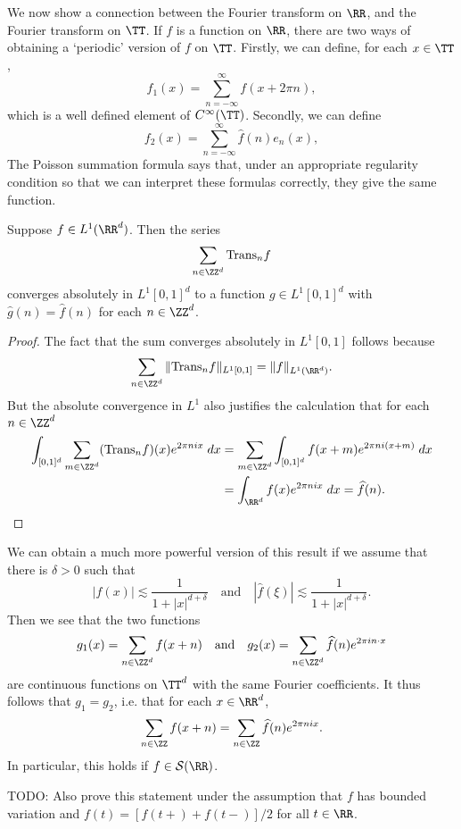 We now show a connection between the Fourier transform on $\RR$, and the Fourier transform on $\TT$. If $f$ is a function on $\RR$, there are two ways of obtaining a `periodic' version of $f$ on $\TT$. Firstly, we can define, for each $x \in \TT$,
%
\[ f_1(x) = \sum_{n = -\infty}^\infty f(x + 2 \pi n), \]
%
which is a well defined element of $C^\infty(\TT)$. Secondly, we can define
%
\[ f_2(x) = \sum_{n = -\infty}^\infty \widehat{f}(n) e_n(x), \]
%
The Poisson summation formula says that, under an appropriate regularity condition so that we can interpret these formulas correctly, they give the same function.

\begin{theorem}
    Suppose $f \in L^1(\RR^d)$. Then the series
    \[ \sum_{n \in \ZZ^d} \text{Trans}_n f \]
    converges absolutely in $L^1[0,1]^d$ to a function $g \in L^1[0,1]^d$ with $\widehat{g}(n) = \widehat{f}(n)$ for each $n \in \ZZ^d$.
\end{theorem}
\begin{proof}
    The fact that the sum converges absolutely in $L^1[0,1]$ follows because
    \[ \sum_{n \in \ZZ^d} \| \text{Trans}_n f \|_{L^1[0,1]} = \| f \|_{L^1(\RR^d)}. \]
    But the absolute convergence in $L^1$ also justifies the calculation that for each $n \in \ZZ^d$
    \begin{align*}
        \int_{[0,1]^d} \sum_{m \in \ZZ^d} (\text{Trans}_n f)(x) e^{2 \pi nix}\; dx &= \sum_{m \in \ZZ^d} \int_{[0,1]^d} f(x + m) e^{2 \pi n i (x + m)}\; dx\\
        &= \int_{\RR^d} f(x) e^{2 \pi n i x}\; dx = \widehat{f}(n). \qedhere
    \end{align*}
\end{proof}

We can obtain a much more powerful version of this result if we assume that there is $\delta > 0$ such that
%
\[ |f(x)| \lesssim \frac{1}{1 + |x|^{d + \delta}} \quad\text{and}\quad |\widehat{f}(\xi)| \lesssim \frac{1}{1 + |x|^{d + \delta}}. \]
%
Then we see that the two functions
%
\[ g_1(x) = \sum_{n \in \ZZ^d} f(x + n) \quad\text{and}\quad g_2(x) = \sum_{n \in \ZZ^d} \widehat{f}(n) e^{2 \pi i n \cdot x} \]
%
are continuous functions on $\TT^d$ with the same Fourier coefficients. It thus follows that $g_1 = g_2$, i.e. that for each $x \in \RR^d$,
%
\[ \sum_{n \in \ZZ} f(x + n) = \sum_{n \in \ZZ} \widehat{f}(n) e^{2 \pi n i x}. \]
%
In particular, this holds if $f \in \mathcal{S}(\RR)$.

TODO: Also prove this statement under the assumption that $f$ has bounded variation and $f(t) = [f(t+) + f(t-)]/2$ for all $t \in \RR$.  

